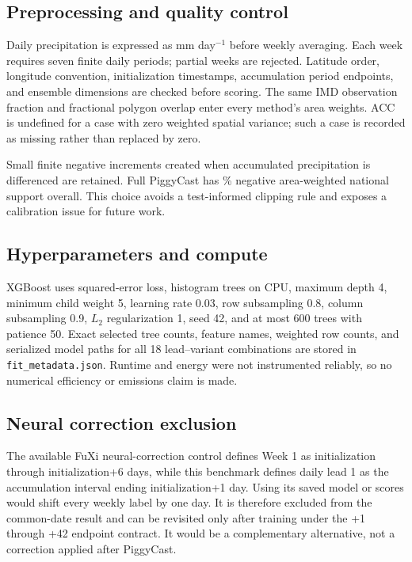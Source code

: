 \subsection{Preprocessing and quality control}

Daily precipitation is expressed as mm day$^{-1}$ before weekly averaging.
Each week requires seven finite daily periods; partial weeks are rejected.
Latitude order, longitude convention, initialization timestamps, accumulation
period endpoints, and ensemble dimensions are checked before scoring. The
same IMD observation fraction and fractional polygon overlap enter every
method's area weights. ACC is undefined for a case with zero weighted spatial
variance; such a case is recorded as missing rather than replaced by zero.

Small finite negative increments created when accumulated precipitation is
differenced are retained. Full PiggyCast has
\FullNegativePercent{}\% negative area-weighted national support overall. This
choice avoids a test-informed clipping rule and exposes a calibration issue
for future work.

\subsection{Hyperparameters and compute}

XGBoost uses squared-error loss, histogram trees on CPU, maximum depth 4,
minimum child weight 5, learning rate 0.03, row subsampling 0.8, column
subsampling 0.9, $L_2$ regularization 1, seed 42, and at most 600 trees with
patience 50. Exact selected tree counts, feature names, weighted row counts,
and serialized model paths for all 18 lead--variant combinations are stored in
\texttt{fit\_metadata.json}. Runtime and energy were not instrumented
reliably, so no numerical efficiency or emissions claim is made.

\subsection{Neural correction exclusion}

The available FuXi neural-correction control defines Week 1 as initialization
through initialization+6 days, while this benchmark defines daily lead 1 as
the accumulation interval ending initialization+1 day. Using its saved model
or scores would shift every weekly label by one day. It is therefore excluded
from the common-date result and can be revisited only after training under the
+1 through +42 endpoint contract. It would be a complementary alternative,
not a correction applied after PiggyCast.


